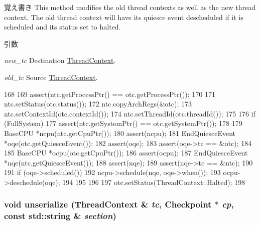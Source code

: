 \begin{DoxyNote}{覚え書き}
This method modifies the old thread contexts as well as the new thread context. The old thread context will have its quiesce event descheduled if it is scheduled and its status set to halted.
\end{DoxyNote}

\begin{DoxyParams}{引数}
\item[{\em new\_\-tc}]Destination \hyperlink{classThreadContext}{ThreadContext}. \item[{\em old\_\-tc}]Source \hyperlink{classThreadContext}{ThreadContext}. \end{DoxyParams}



\begin{DoxyCode}
168 {
169     assert(ntc.getProcessPtr() == otc.getProcessPtr());
170 
171     ntc.setStatus(otc.status());
172     ntc.copyArchRegs(&otc);
173     ntc.setContextId(otc.contextId());
174     ntc.setThreadId(otc.threadId());
175 
176     if (FullSystem) {
177         assert(ntc.getSystemPtr() == otc.getSystemPtr());
178 
179         BaseCPU *ncpu(ntc.getCpuPtr());
180         assert(ncpu);
181         EndQuiesceEvent *oqe(otc.getQuiesceEvent());
182         assert(oqe);
183         assert(oqe->tc == &otc);
184 
185         BaseCPU *ocpu(otc.getCpuPtr());
186         assert(ocpu);
187         EndQuiesceEvent *nqe(ntc.getQuiesceEvent());
188         assert(nqe);
189         assert(nqe->tc == &ntc);
190 
191         if (oqe->scheduled()) {
192             ncpu->schedule(nqe, oqe->when());
193             ocpu->deschedule(oqe);
194         }
195     }
196 
197     otc.setStatus(ThreadContext::Halted);
198 }
\end{DoxyCode}
\hypertarget{thread__context_8hh_aab2bbbf3710db70a2886ed6c49038af7}{
\subsubsection[{unserialize}]{\setlength{\rightskip}{0pt plus 5cm}void unserialize ({\bf ThreadContext} \& {\em tc}, \/  {\bf Checkpoint} $\ast$ {\em cp}, \/  const std::string \& {\em section})}}
\label{thread__context_8hh_aab2bbbf3710db70a2886ed6c49038af7}



